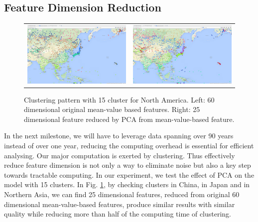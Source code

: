 \subsection{Feature Dimension Reduction}
\begin{figure}
    \centering
    \begin{tabular}{c c}
        \includegraphics[width=.45\linewidth]{./figure/Ave_25_comp_15_clu_Asia.png}
        & \includegraphics[width=.45\linewidth]{./figure/Ave_60_comp_15_clu_Asia.png}
    \end{tabular}
    \caption{Clustering pattern with 15 cluster for North America. Left: 60 dimensional original mean-value based features. Right: 25 dimensional feature reduced by PCA from mean-value-based feature.}
    \label{fig:VarFeature}
\end{figure}
In the next milestone, we will have to leverage data spanning over 90 years instead of over one year, reducing the computing overhead is essential for efficient analysing. Our major computation is exerted by clustering. Thus effectively reduce feature dimension is not only a way to eliminate noise but also a key step towards tractable computing. In our experiment, we test the effect of PCA on the model with 15 clusters. In Fig. \ref{fig:VarFeature}, by checking clusters in China, in Japan and in Northern Asia, we can find 25 dimensional features, reduced from original 60 dimensional mean-value-based features, produce similar results with similar quality while reducing more than half of the computing time of clustering. 




